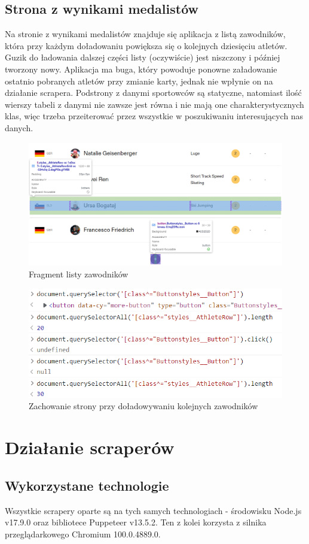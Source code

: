\documentclass[a4paper,11pt]{article}
\begin{document}
\subsection{Strona z wynikami medalistów}
    Na stronie z wynikami medalistów znajduje się aplikacja z listą zawodników,
    która przy każdym doładowaniu powiększa się o kolejnych dziesięciu atletów.
    Guzik do ładowania dalszej części listy (oczywiście) jest niszczony i później
    tworzony nowy. Aplikacja ma buga, który powoduje ponowne załadowanie ostatnio
    pobranych atletów przy zmianie karty, jednak nie wpłynie on na działanie
    scrapera. Podstrony z danymi sportowców są statyczne, natomiast ilość wierszy
    tabeli z danymi nie zawsze jest równa i nie mają one charakterystycznych
    klas, więc trzeba przeiterować przez wszystkie w poszukiwaniu interesujących 
    nas danych.
    \begin{figure}[H]
        \centering
        \includegraphics[width=0.8\linewidth]{2-fragmentlisty.png}
        \caption{Fragment listy zawodników}
    \end{figure}

    \begin{figure}[H]
        \centering
        \includegraphics[width=0.5\linewidth]{2-zachowanielisty.png}
        \caption{Zachowanie strony przy doładowywaniu kolejnych zawodników}
    \end{figure}

\section{Działanie scraperów}
\subsection{Wykorzystane technologie}
Wszystkie scrapery oparte są na tych samych technologiach - środowisku Node.js
v17.9.0 oraz bibliotece Puppeteer v13.5.2. Ten z kolei korzysta z silnika
przeglądarkowego Chromium 100.0.4889.0.
\end{document}
